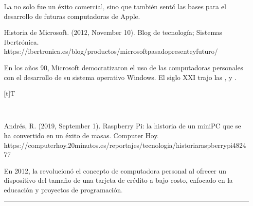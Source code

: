 \documentclass[letterpaper,10pt,spanish]{sphinxmanual}
\let\sphinxpxdimen\pdfpxdimen\else\newdimen\sphinxpxdimen
\begin{document}
\sphinxAtStartPar
La  no solo fue un éxito comercial, sino que también sentó las bases para el desarrollo de futuras computadoras de Apple.

\sphinxAtStartPar
%
\begin{footnote}[8]\sphinxAtStartFootnote
Historia de Microsoft. (2012, November 10). Blog de tecnología; Sistemas Ibertrónica. https://ibertronica.es/blog/productos/microsoft\sphinxhyphen{}pasado\sphinxhyphen{}presente\sphinxhyphen{}y\sphinxhyphen{}futuro/
%
\end{footnote} En los años 90, Microsoft democratizaron el uso de las computadoras personales con el desarrollo de su sistema operativo Windows. El siglo XXI trajo las ,  y .


\begin{savenotes}\sphinxattablestart
\sphinxthistablewithglobalstyle
\centering
\begin{tabulary}{\linewidth}[t]{T}
\sphinxtoprule
\sphinxtableatstartofbodyhook

\begin{sphinxfigure-in-table}
\centering
\capstart
\noindent\sphinxincludegraphics[width=500\sphinxpxdimen]{{image06}.png}
\label{\detokenize{cursos/informatica10/recursos/T01:id31}}\end{sphinxfigure-in-table}\relax
\\
\sphinxbottomrule
\end{tabulary}
\sphinxtableafterendhook\par
\sphinxattableend\end{savenotes}

\sphinxAtStartPar
%
\begin{footnote}[9]\sphinxAtStartFootnote
Andrés, R. (2019, September 1). Raspberry Pi: la historia de un mini\sphinxhyphen{}PC que se ha convertido en un éxito de masas. Computer Hoy. https://computerhoy.20minutos.es/reportajes/tecnologia/historia\sphinxhyphen{}raspberry\sphinxhyphen{}pi\sphinxhyphen{}482477
%
\end{footnote} En 2012, la  revolucionó el concepto de computadora personal al ofrecer un dispositivo del tamaño de una tarjeta de crédito a bajo costo, enfocado en la educación y proyectos de programación.


\bigskip\hrule\bigskip
\end{document}

